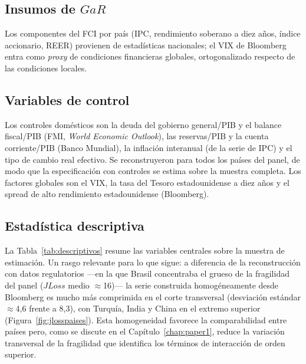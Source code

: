 \subsection{Insumos de \texorpdfstring{$GaR$}{GaR}}
Los componentes del FCI por país (IPC, rendimiento soberano a diez años, índice accionario, REER) provienen de estadísticas nacionales; el VIX de Bloomberg entra como \textit{proxy} de condiciones financieras globales, ortogonalizado respecto de las condiciones locales.

\subsection{Variables de control}
Los controles domésticos son la deuda del gobierno general/PIB y el balance fiscal/PIB (FMI, \textit{World Economic Outlook}), las reservas/PIB y la cuenta corriente/PIB (Banco Mundial), la inflación interanual (de la serie de IPC) y el tipo de cambio real efectivo. Se reconstruyeron para todos los países del panel, de modo que la especificación con controles se estima sobre la muestra completa. Los factores globales son el VIX, la tasa del Tesoro estadounidense a diez años y el spread de alto rendimiento estadounidense (Bloomberg).

\subsection{Estadística descriptiva}

La Tabla~\ref{tab:descriptivos} resume las variables centrales sobre la muestra de estimación. Un rasgo relevante para lo que sigue: a diferencia de la reconstrucción con datos regulatorios —en la que Brasil concentraba el grueso de la fragilidad del panel ($JLoss$ medio $\approx$16)— la serie construida homogéneamente desde Bloomberg es mucho más comprimida en el corte transversal (desviación estándar $\approx$4,6 frente a 8,3), con Turquía, India y China en el extremo superior (Figura~\ref{fig:jlosspaises}). Esta homogeneidad favorece la comparabilidad entre países pero, como se discute en el Capítulo~\ref{chap:paper1}, reduce la variación transversal de la fragilidad que identifica los términos de interacción de orden superior.

